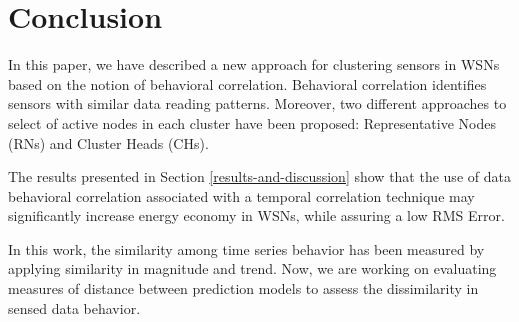 \documentclass[conference]{IEEEtran}
\begin{document}
\section{Conclusion}
\label{conclusion}

In this paper, we have described a new approach for clustering sensors in WSNs
based on the notion of behavioral correlation. Behavioral correlation identifies
sensors with similar data reading patterns. Moreover, two different approaches
to select of active nodes in each cluster have been proposed:
Representative Nodes (RNs) and Cluster Heads (CHs).

The results presented in Section \ref{results-and-discussion} show that the use
of data behavioral correlation associated with a temporal correlation technique
may significantly increase energy economy in WSNs, while assuring a low RMS
Error.

In this work, the similarity among time series behavior has been measured by
applying similarity in magnitude and trend. Now, we are working on evaluating
measures of distance between prediction models to assess the dissimilarity in
sensed data behavior.






  
\end{document}
